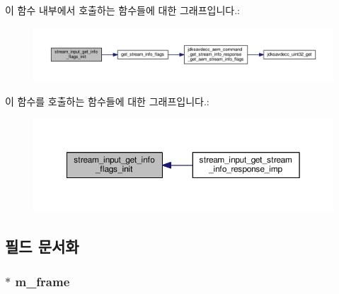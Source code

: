 이 함수 내부에서 호출하는 함수들에 대한 그래프입니다.\+:
\nopagebreak
\begin{figure}[H]
\begin{center}
\leavevmode
\includegraphics[width=350pt]{classavdecc__lib_1_1stream__input__get__stream__info__response__imp_a1bb3de0d949222dc7d11d16b62b41ae4_cgraph}
\end{center}
\end{figure}




이 함수를 호출하는 함수들에 대한 그래프입니다.\+:
\nopagebreak
\begin{figure}[H]
\begin{center}
\leavevmode
\includegraphics[width=350pt]{classavdecc__lib_1_1stream__input__get__stream__info__response__imp_a1bb3de0d949222dc7d11d16b62b41ae4_icgraph}
\end{center}
\end{figure}




\subsection{필드 문서화}
\subsubsection[{\texorpdfstring{m\+\_\+frame}{m_frame}}]{$\ast$ m\+\_\+frame\hspace{0.3cm}{\ttfamily [private]}}\hypertarget{classavdecc__lib_1_1stream__input__get__stream__info__response__imp_a50417969cf438e7c8d698726bbbe2ff9}{}\label{classavdecc__lib_1_1stream__input__get__stream__info__response__imp_a50417969cf438e7c8d698726bbbe2ff9}


